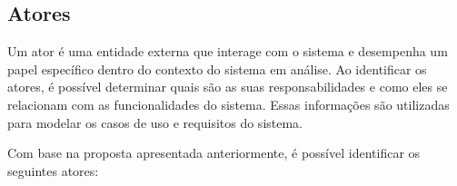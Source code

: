 \subsection{Atores}
Um ator é uma entidade externa que interage com o sistema e desempenha um papel específico dentro do contexto do sistema em análise. Ao identificar os atores, é possível determinar quais são as suas responsabilidades e como eles se relacionam com as funcionalidades do sistema. Essas informações são utilizadas para modelar os casos de uso e requisitos do sistema.

Com base na proposta apresentada anteriormente, é possível identificar os seguintes atores:

